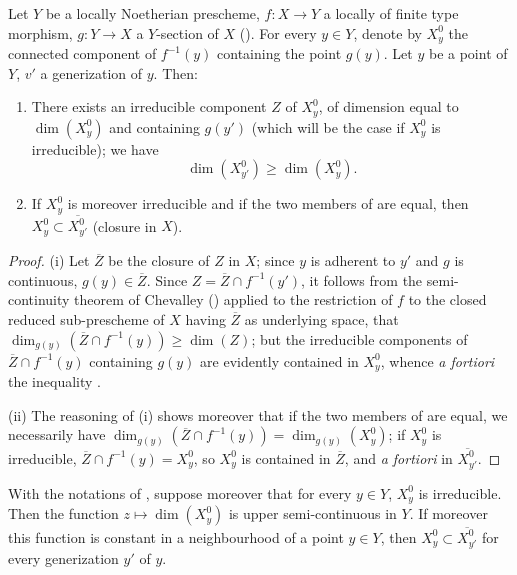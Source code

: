 \begin{proposition}[15.6.1]
\label{IV.15.6.1}
Let $Y$ be a locally Noetherian prescheme, $f:X\to Y$ a locally of finite type morphism, $g:Y\to X$ a $Y$-section of $X$ ().
For every $y\in Y$, denote by $X_y^0$ the connected component of $f^{-1}(y)$ containing the point $g(y)$.
Let $y$ be a point of $Y$, $v'$ a generization of $y$.
Then:
\begin{enumerate}[label=(\roman*)]
  \item There exists an irreducible component $Z$ of $X_y^0$, of dimension equal to $\dim(X_y^0)$ and containing $g(y')$ (which will be the case if $X_y^0$ is irreducible); we have
\begin{equation}
\tag{15.6.1.1}
\label{IV.15.6.1.1}
  \dim(X_{y'}^0) \geq \dim(X_y^0).
\end{equation}
  \item If $X_y^0$ is moreover irreducible and if the two members of  are equal, then $X_y^0\subset\overline{X_{y'}^0}$ (closure in $X$).
\end{enumerate}
\end{proposition}

\begin{proof}
(i)
Let $\overline{Z}$ be the closure of $Z$ in $X$; since $y$ is adherent to $y'$ and $g$ is continuous, $g(y)\in\overline{Z}$.
Since $Z=\overline{Z}\cap f^{-1}(y')$, it follows from the semi-continuity theorem of Chevalley () applied to the restriction of $f$ to the closed reduced sub-prescheme of $X$ having $\overline{Z}$ as underlying space, that $\dim_{g(y)}(\overline{Z}\cap f^{-1}(y))\geq\dim(Z)$; but the irreducible components of $\overline{Z}\cap f^{-1}(y)$ containing $g(y)$ are evidently contained in $X_y^0$, whence \emph{a fortiori} the inequality .

(ii)
The reasoning of (i) shows moreover that if the two members of  are equal, we necessarily have $\dim_{g(y)}(\overline{Z}\cap f^{-1}(y))=\dim_{g(y)}(X_y^0)$; if $X_y^0$ is irreducible, $\overline{Z}\cap f^{-1}(y)=X_y^0$, so $X_y^0$ is contained in $\overline{Z}$, and \emph{a fortiori} in $\overline{X_{y'}^0}$.
\end{proof}

\begin{corollary}[15.6.2]
\label{IV.15.6.2}
With the notations of , suppose moreover that for every $y\in Y$, $X_y^0$ is irreducible.
Then the function $z\mapsto\dim(X_y^0)$ is upper semi-continuous in $Y$.
If moreover this function is constant in a neighbourhood of a point $y\in Y$, then $X_y^0\subset\overline{X_{y'}^0}$ for every generization $y'$ of $y$.
\end{corollary}

